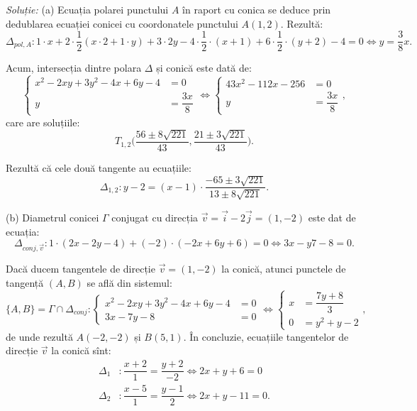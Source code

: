 \emph{Soluție:}
	(a) Ecuația polarei punctului $A$ în raport cu conica se deduce prin
dedublarea ecuației conicei cu coordonatele punctului $A(1,2)$. Rezultă: 
 \[
	\Delta_{pol, A}: 1 \cdot x + 2 \cdot \dfrac{1}{2}(x \cdot 2 + 1 \cdot y)
	+ 3 \cdot 2y - 4 \cdot \dfrac{1}{2} \cdot (x + 1) + 
	6 \cdot \dfrac{1}{2}\cdot (y + 2) - 4 = 0 \Longleftrightarrow 
	y = \dfrac{3}{8} x.
\]

Acum, intersecția dintre polara $\Delta$ și conică este dată de: 
 \[
	\begin{cases}	
	    x^2 - 2xy + 3y^2 - 4x + 6y - 4 &= 0 \\
	    y &= \dfrac{3x}{8}
    \end{cases} \Longleftrightarrow  \begin{cases}	
	                                     43x^2 - 112 x - 256 &= 0 \\
	                                     y &= \dfrac{3x}{8}
                                     \end{cases},
\]
care are soluțiile: 
 \[
	T_{1,2} \Big( \dfrac{56 \pm 8 \sqrt{221}}{43}, 
	\dfrac{21 \pm 3 \sqrt{221}}{43} \Big).
\]

Rezultă că cele două tangente au ecuațiile: 
 \[
	\Delta_{1,2}: y - 2 = (x - 1) \cdot 
	\dfrac{-65 \pm 3 \sqrt{221}}{13 \pm 8 \sqrt{221}}.
\]

(b) Diametrul conicei $\Gamma$ conjugat cu direcția 
$\vec{v} = \vec{i} - 2 \vec{j} = (1, -2)$ este dat de ecuația: 
 \[
	\Delta_{conj, \vec{v}}: 1 \cdot (2x - 2y - 4) + (-2) \cdot (-2x + 6y + 6) 
	= 0 \Longleftrightarrow 3x - y7 - 8 = 0.
\]

Dacă ducem tangentele de direcție $\vec{v} = (1, -2)$ la conică, atunci punctele
 de tangență $(A,B)$ se află din sistemul: 
 \[
	\{A, B\} = \Gamma \cap \Delta_{conj}:
	\begin{cases}	
	    x^2 - 2xy + 3y^2 - 4x + 6y - 4 &= 0 \\
	    3x - 7y - 8 &= 0
    \end{cases} \Longleftrightarrow \begin{cases}	
	                                    x &= \dfrac{7y + 8}{3} \\
	                                    0 &= y^2 + y - 2
                                    \end{cases},
\]
de unde rezultă $A(-2, -2)$ și $B(5, 1)$. În concluzie, ecuațiile tangentelor
de direcție $\vec{v}$ la conică sînt:
\begin{align*}
	\Delta_1 &: \dfrac{x + 2}{1} = \dfrac{y + 2}{-2} \Longleftrightarrow 
	            2x + y + 6 = 0 \\
	\Delta_2 &: \dfrac{x-5}{1} = \dfrac{y - 1}{2} \Longleftrightarrow 
	            2x + y - 11 = 0.
\end{align*}

